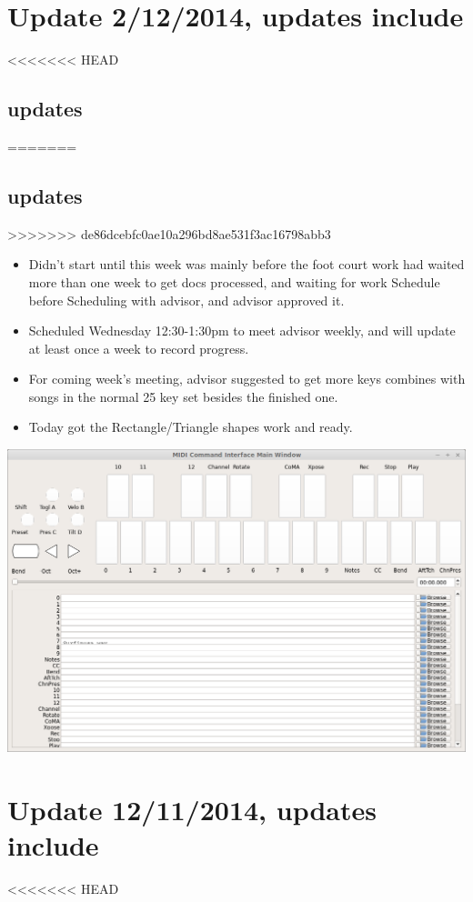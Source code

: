\documentclass[9pt,b5paper]{article}
\begin{document}
\section{Update 2/12/2014, updates include}
<<<<<<< HEAD
\label{sec-7}
\subsection{updates}
\label{sec-7-1}
=======
\label{sec-6}
\subsection{updates}
\label{sec-6-1}
>>>>>>> de86dcebfc0ae10a296bd8ae531f3ac16798abb3
\begin{itemize}
\item Didn't start until this week was mainly before the foot court work had waited more than one week to get docs processed, and waiting for work Schedule before Scheduling with advisor, and advisor approved it.
\item Scheduled Wednesday 12:30-1:30pm to meet advisor weekly, and will update at least once a week to record progress.
\item For coming week's meeting, advisor suggested to get more keys combines with songs in the normal 25 key set besides the finished one.
\item Today got the Rectangle/Triangle shapes work and ready.
\end{itemize}
\includegraphics[width=.9\linewidth]{./pic/Screenshot_from_2015-02-13_22:19:11.png}

\section{Update 12/11/2014, updates include}
<<<<<<< HEAD
\label{sec-8}
\end{document}
